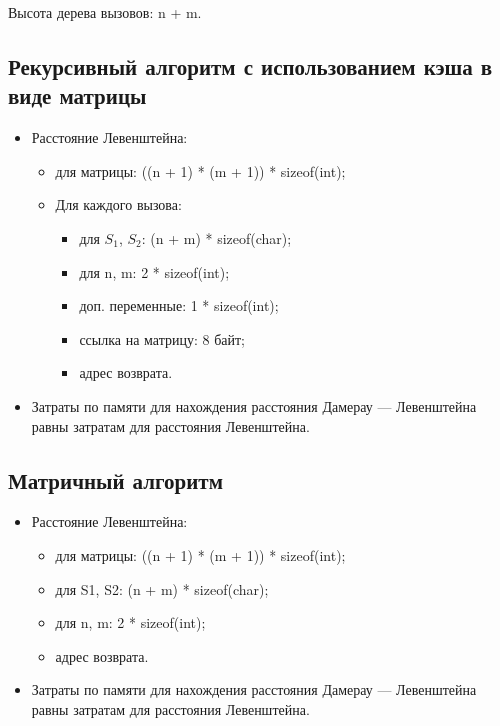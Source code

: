 Высота дерева вызовов: n + m.

\subsection{Рекурсивный алгоритм с использованием кэша в виде матрицы}

\begin{itemize}[label={---}]
	\item Расстояние Левенштейна:
	\begin{itemize}[label=---]
		\item для матрицы: ((n + 1) * (m + 1)) * sizeof(int);
		\item Для каждого вызова:
		\begin{itemize}[label=---]
			\item для $S_1$, $S_2$: (n + m) * sizeof(char);
			\item для n, m: 2 * sizeof(int);
			\item доп. переменные: 1 * sizeof(int);
			\item ссылка на матрицу: 8 байт;
			\item адрес возврата.
		\end{itemize}
	\end{itemize}
	
	\item Затраты по памяти для нахождения расстояния Дамерау --- Левенштейна равны затратам для расстояния Левенштейна.
\end{itemize}

\subsection{Матричный алгоритм}

\begin{itemize}[label={---}]
	\item Расстояние Левенштейна:
	\begin{itemize}[label=---]
		\item для матрицы: ((n + 1) * (m + 1)) * sizeof(int);
		\item для S1, S2: (n + m) * sizeof(char);
		\item для n, m: 2 * sizeof(int);
		\item адрес возврата.
	\end{itemize}
	
	\item Затраты по памяти для нахождения расстояния Дамерау --- Левенштейна равны затратам для расстояния Левенштейна.
\end{itemize}

